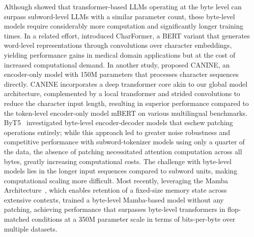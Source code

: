 Although \cite{Choe2019BridgingTG} showed that transformer-based LLMs operating at the byte level can surpass subword-level LLMs with a similar parameter count, these byte-level models require considerably more computation and significantly longer training times. In a related effort, \cite{el2020characterbert} introduced CharFormer, a BERT variant that generates word-level representations through convolutions over character embeddings, yielding performance gains in medical domain applications but at the cost of increased computational demand. In another study, \cite{clark2022canine} proposed CANINE, an encoder-only model with 150M parameters that processes character sequences directly. CANINE incorporates a deep transformer core akin to our global model architecture, complemented by a local transformer and strided convolutions to reduce the character input length, resulting in superior performance compared to the token-level encoder-only model mBERT on various multilingual benchmarks. ByT5~\citep{xue2022byt5} investigated byte-level encoder-decoder models that eschew patching operations entirely; while this approach led to greater noise robustness and competitive performance with subword-tokenizer models using only a quarter of the data, the absence of patching necessitated attention computation across all bytes, greatly increasing computational costs. The challenge with byte-level models lies in the longer input sequences compared to subword units, making computational scaling more difficult. Most recently, leveraging the Mamba Architecture~\citep{gu2023mamba}, which enables retention of a fixed-size memory state across extensive contexts, \cite{wang2024mambabyte} trained a byte-level Mamba-based model without any patching, achieving performance that surpasses byte-level transformers in flop-matched conditions at a 350M parameter scale in terms of bits-per-byte over multiple datasets.

